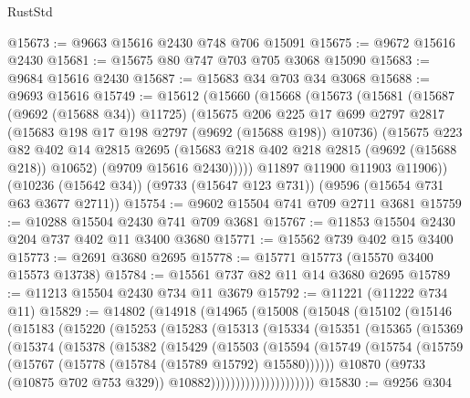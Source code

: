 \begin{lexlean}{RustStd}
\begin{coremodule}
@15673 := @9663 @15616 @2430 @748 @706 @15091
@15675 := @9672 @15616 @2430
@15681 := @15675 @80 @747 @703 @705 @3068 @15090
@15683 := @9684 @15616 @2430
@15687 := @15683 @34 @703 @34 @3068
@15688 := @9693 @15616
@15749 := @15612
    (@15660
      (@15668
        (@15673
          (@15681
            (@15687 (@9692 (@15688 @34)) @11725)
            (@15675
              @206
              @225
              @17
              @699
              @2797
              @2817
              (@15683 @198 @17 @198 @2797 (@9692 (@15688 @198)) @10736)
              (@15675
                @223
                @82
                @402
                @14
                @2815
                @2695
                (@15683 @218 @402 @218 @2815 (@9692 (@15688 @218)) @10652)
                (@9709 @15616 @2430)))))
        @11897
        @11900
        @11903
        @11906))
    (@10236 (@15642 @34))
    (@9733 (@15647 @123 @731))
    (@9596 (@15654 @731 @63 @3677 @2711))
@15754 := @9602 @15504 @741 @709 @2711 @3681
@15759 := @10288 @15504 @2430 @741 @709 @3681
@15767 := @11853 @15504 @2430 @204 @737 @402 @11 @3400 @3680
@15771 := @15562 @739 @402 @15 @3400
@15773 := @2691 @3680 @2695
@15778 := @15771 @15773 (@15570 @3400 @15573 @13738)
@15784 := @15561 @737 @82 @11 @14 @3680 @2695
@15789 := @11213 @15504 @2430 @734 @11 @3679
@15792 := @11221 (@11222 @734 @11)
@15829 := @14802
    (@14918
      (@14965
        (@15008
          (@15048
            (@15102
              (@15146
                (@15183
                  (@15220
                    (@15253
                      (@15283
                        (@15313
                          (@15334
                            (@15351
                              (@15365
                                (@15369
                                  (@15374
                                    (@15378
                                      (@15382
                                        (@15429
                                          (@15503
                                            (@15594
                                              (@15749
                                                (@15754
                                                  (@15759
                                                    (@15767
                                                      (@15778 (@15784 (@15789 @15792) @15580))))))
                                              @10870
                                              (@9733 (@10875 @702 @753 @329))
                                              @10882)))))))))))))))))))))
@15830 := @9256 @304

\end{coremodule}
\end{lexlean}
